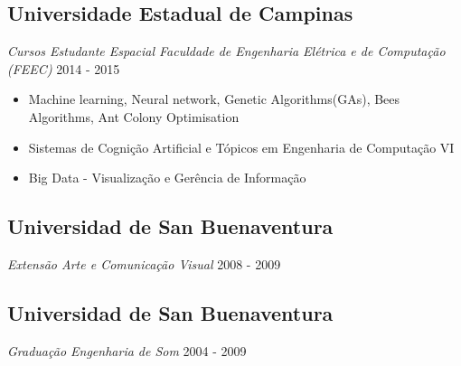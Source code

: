 \documentclass[a4paper,10pt]{article}
\begin{document}
\subsection*{Universidade Estadual de Campinas}
\textcolor{corSubSection}{\emph{Cursos Estudante Espacial Faculdade de Engenharia Elétrica e de Computação (FEEC)}}
\hfill \textcolor{corSubSection}{2014 - 2015}

\begin{itemize}
    \item Machine learning, Neural network, Genetic Algorithms(GAs), Bees Algorithms, Ant Colony Optimisation
    \item Sistemas de Cognição Artificial e Tópicos em Engenharia de Computação VI
    \item Big Data - Visualização e Gerência de Informação
\end{itemize}

\subsection*{Universidad de San Buenaventura}
\textcolor{corSubSection}{\emph{Extensão Arte e Comunicação Visual}}
\hfill \textcolor{corSubSection}{2008 - 2009}

\subsection*{Universidad de San Buenaventura}
\textcolor{corSubSection}{\emph{Graduação Engenharia de Som}}
\hfill \textcolor{corSubSection}{2004 - 2009}








\end{document}
